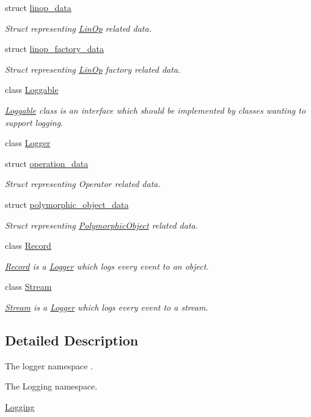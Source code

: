 \begin{DoxyCompactItemize}
struct \hyperlink{structgko_1_1log_1_1linop__data}{linop\+\_\+data}
\begin{DoxyCompactList}\small\item\em Struct representing \hyperlink{classgko_1_1LinOp}{Lin\+Op} related data. \end{DoxyCompactList}\item 
struct \hyperlink{structgko_1_1log_1_1linop__factory__data}{linop\+\_\+factory\+\_\+data}
\begin{DoxyCompactList}\small\item\em Struct representing \hyperlink{classgko_1_1LinOp}{Lin\+Op} factory related data. \end{DoxyCompactList}\item 
class \hyperlink{classgko_1_1log_1_1Loggable}{Loggable}
\begin{DoxyCompactList}\small\item\em \hyperlink{classgko_1_1log_1_1Loggable}{Loggable} class is an interface which should be implemented by classes wanting to support logging. \end{DoxyCompactList}\item 
class \hyperlink{classgko_1_1log_1_1Logger}{Logger}
\item 
struct \hyperlink{structgko_1_1log_1_1operation__data}{operation\+\_\+data}
\begin{DoxyCompactList}\small\item\em Struct representing Operator related data. \end{DoxyCompactList}\item 
struct \hyperlink{structgko_1_1log_1_1polymorphic__object__data}{polymorphic\+\_\+object\+\_\+data}
\begin{DoxyCompactList}\small\item\em Struct representing \hyperlink{classgko_1_1PolymorphicObject}{Polymorphic\+Object} related data. \end{DoxyCompactList}\item 
class \hyperlink{classgko_1_1log_1_1Record}{Record}
\begin{DoxyCompactList}\small\item\em \hyperlink{classgko_1_1log_1_1Record}{Record} is a \hyperlink{classgko_1_1log_1_1Logger}{Logger} which logs every event to an object. \end{DoxyCompactList}\item 
class \hyperlink{classgko_1_1log_1_1Stream}{Stream}
\begin{DoxyCompactList}\small\item\em \hyperlink{classgko_1_1log_1_1Stream}{Stream} is a \hyperlink{classgko_1_1log_1_1Logger}{Logger} which logs every event to a stream. \end{DoxyCompactList}\end{DoxyCompactItemize}


\subsection{Detailed Description}
The logger namespace . 

The Logging namespace.

\hyperlink{group__log}{Logging} 